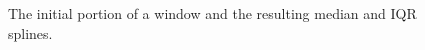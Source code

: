 \documentclass[11pt]{article}
\begin{document}
\begin{figure}[H]
{			\label{fig:Spline_Median}
		}
		\caption{\footnotesize The initial portion of a window and the resulting median and IQR splines.} 
		\label{fig:splines}
	\end{figure}		
	 
\end{document}
